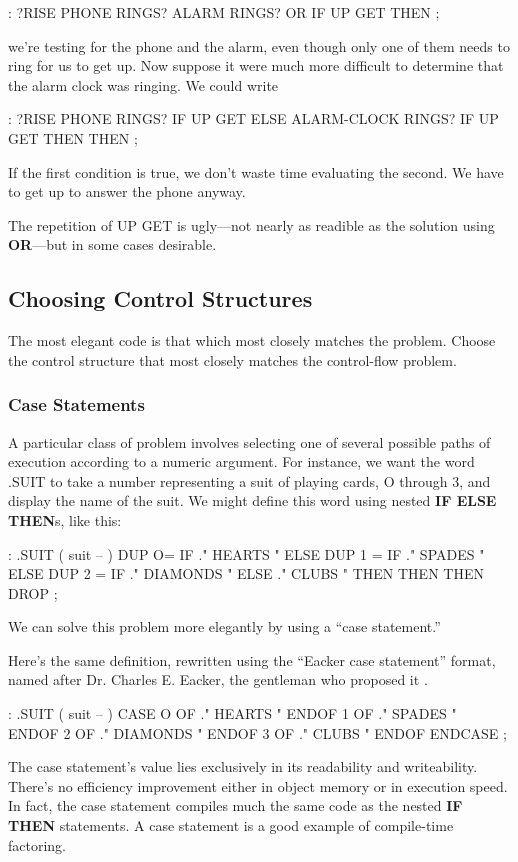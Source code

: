\begin{Code}
: ?RISE  PHONE RINGS?  ALARM RINGS? OR  IF  UP GET THEN ;
\end{Code}
we're testing for the phone and the alarm, even though only one of them
needs to ring for us to get up. Now suppose it were much more difficult to
determine that the alarm clock was ringing. We could write

\begin{Code}
: ?RISE   PHONE RINGS? IF  UP GET  ELSE
     ALARM-CLOCK RINGS?  IF UP GET THEN THEN  ;
\end{Code}
If the first condition is true, we don't waste time evaluating the second.
We have to get up to answer the phone anyway.

The repetition of UP GET is ugly---not nearly as readible as the
solution using \textbf{OR}---but in some cases desirable.

\subsection{Choosing Control Structures}
\begin{tip}
The most elegant code is that which most closely matches the problem.
Choose the control structure that most closely matches the control-flow
problem.
\end{tip}
\subsubsection{Case Statements}

A particular class of problem involves selecting one of several possible
paths of execution according to a numeric argument. For instance, we
want the word .SUIT to take a number representing a suit of playing
cards, O through 3, and display the name of the suit. We might define this
word using nested \textbf{IF ELSE THEN}s, like this:

\begin{Code}
: .SUIT ( suit -- )
  DUP  O=  IF ." HEARTS "   ELSE
  DUP  1 = IF ." SPADES "   ELSE
  DUP  2 = IF ." DIAMONDS " ELSE
              ." CLUBS "
  THEN THEN THEN  DROP ;
\end{Code}
We can solve this problem more elegantly by using a ``case statement.''

Here's the same definition, rewritten using the ``Eacker case statement''
format, named after Dr. Charles E. Eacker, the gentleman who proposed
it \cite{eaker}.

\begin{Code}
: .SUIT ( suit -- )
  CASE
  O OF   ." HEARTS "    ENDOF
  1 OF   ." SPADES "    ENDOF
  2 OF   ." DIAMONDS "  ENDOF
  3 OF   ." CLUBS "     ENDOF     ENDCASE ;
\end{Code}
The case statement's value lies exclusively in its readability and
writeability. There's no efficiency improvement either in object memory
or in execution speed. In fact, the case statement compiles much the
same code as the nested \textbf{IF THEN} statements. A case statement is a
good example of compile-time factoring.


